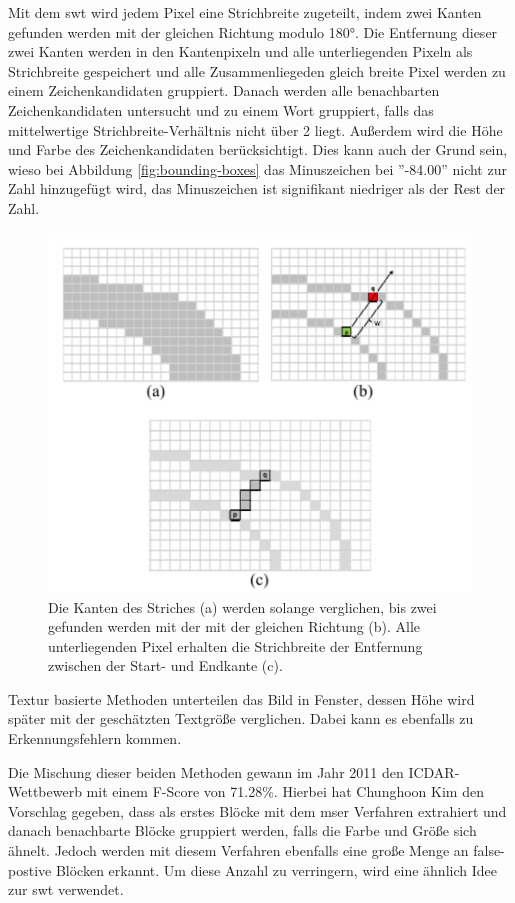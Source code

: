 Mit dem \Gls{swt} wird jedem Pixel eine Strichbreite zugeteilt, indem zwei Kanten gefunden werden mit der gleichen Richtung modulo 180°. Die Entfernung dieser zwei Kanten werden in den Kantenpixeln und alle unterliegenden Pixeln als Strichbreite gespeichert und alle Zusammenliegeden gleich breite Pixel werden zu einem Zeichenkandidaten gruppiert. Danach werden alle benachbarten Zeichenkandidaten untersucht und zu einem Wort gruppiert, falls das mittelwertige Strichbreite-Verhältnis nicht über 2 liegt. Außerdem wird die Höhe und Farbe des Zeichenkandidaten berücksichtigt. Dies kann auch der Grund sein, wieso bei Abbildung \ref{fig:bounding-boxes} das Minuszeichen bei ''-84.00'' nicht zur Zahl hinzugefügt wird, das Minuszeichen ist signifikant niedriger als der Rest der Zahl. \cite{SWT:online}

\begin{figure}[H]
    \centering
    \includegraphics[scale=0.7]{sections/machine-learning/images/SWT.png}
    \caption{Die Kanten des Striches (a) werden solange verglichen, bis zwei gefunden werden mit der mit der gleichen Richtung (b). Alle unterliegenden Pixel erhalten die Strichbreite der Entfernung zwischen der Start- und Endkante (c).}
\end{figure}

Textur basierte Methoden unterteilen das Bild in Fenster, dessen Höhe wird später mit der geschätzten Textgröße verglichen. Dabei kann es ebenfalls zu Erkennungsfehlern kommen.

Die Mischung dieser beiden Methoden gewann im Jahr 2011 den ICDAR-Wettbewerb mit einem F-Score von 71.28\%. Hierbei hat Chunghoon Kim den Vorschlag gegeben, dass als erstes Blöcke mit dem \Gls{mser} Verfahren extrahiert und danach benachbarte Blöcke gruppiert werden, falls die Farbe und Größe sich ähnelt. Jedoch werden mit diesem Verfahren ebenfalls eine große Menge an false-postive Blöcken erkannt. Um diese Anzahl zu verringern, wird eine ähnlich Idee zur \gls{swt} verwendet. \cite{SWT:online}

